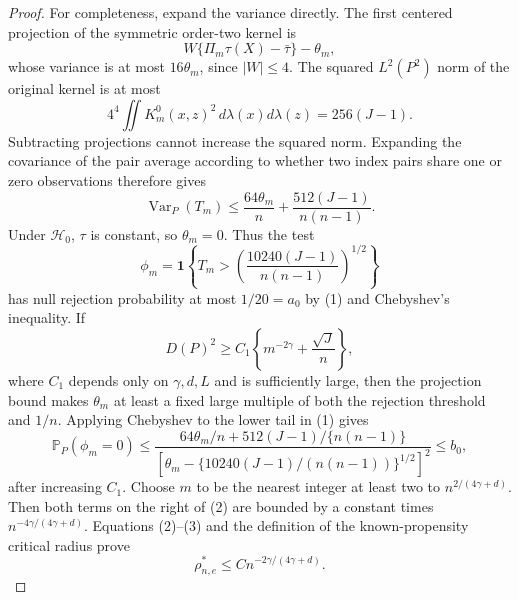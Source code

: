 \documentclass{article}
\begin{document}
\begin{proof}
For completeness, expand the variance directly. The first centered projection of the symmetric order-two kernel is
\[
 W\{\Pi_m\tau(X)-\bar\tau\}-\theta_m,
\]
whose variance is at most \(16\theta_m\), since \(|W|\le4\). The squared \(L^2(P^2)\) norm of the original kernel is at most
\[
 4^4\iint K_m^0(x,z)^2\,d\lambda(x)d\lambda(z)
 =256(J-1).
\]
Subtracting projections cannot increase the squared norm. Expanding the covariance of the pair average according to whether two index pairs share one or zero observations therefore gives
\[
 \operatorname{Var}_P(T_m)
 \le \frac{64\theta_m}{n}
      +\frac{512(J-1)}{n(n-1)}.                                      \tag{1}
\]
Under \(\mathcal H_0\), \(\tau\) is constant, so \(\theta_m=0\). Thus the test
\[
 \phi_m=\mathbf 1\!\left\{T_m>
 \left(\frac{10240(J-1)}{n(n-1)}\right)^{1/2}\right\}
\]
has null rejection probability at most \(1/20=a_0\) by (1) and Chebyshev's inequality. If
\[
 D(P)^2\ge C_1\left\{m^{-2\gamma}+\frac{\sqrt J}{n}\right\},          \tag{2}
\]
where \(C_1\) depends only on \(\gamma,d,L\) and is sufficiently large, then the projection bound makes \(\theta_m\) at least a fixed large multiple of both the rejection threshold and \(1/n\). Applying Chebyshev to the lower tail in (1) gives
\[
 \mathbb P_P(\phi_m=0)
 \le
 \frac{64\theta_m/n+512(J-1)/\{n(n-1)\}}
 {\left[\theta_m-\{10240(J-1)/(n(n-1))\}^{1/2}\right]^2}
 \le b_0,                                                            \tag{3}
\]
after increasing \(C_1\). Choose \(m\) to be the nearest integer at least two to \(n^{2/(4\gamma+d)}\). Then both terms on the right of (2) are bounded by a constant times \(n^{-4\gamma/(4\gamma+d)}\). Equations (2)--(3) and the definition of the known-propensity critical radius prove
\[
 \rho_{n,e}^*\le C n^{-2\gamma/(4\gamma+d)}.                          \tag{4}
\]


\end{proof}
\end{document}
